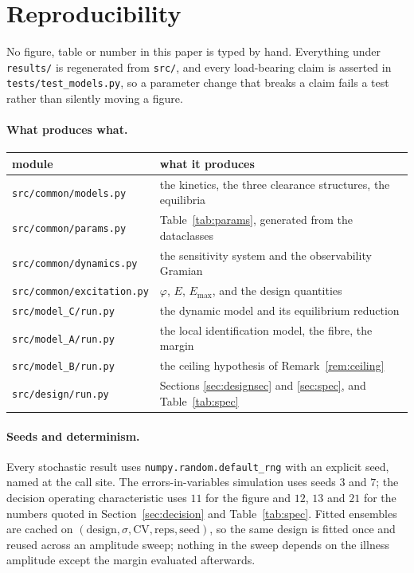 \section{Reproducibility}
\label{sec:repro}

No figure, table or number in this paper is typed by hand. Everything under
\texttt{results/} is regenerated from \texttt{src/}, and every load-bearing claim is asserted
in \texttt{tests/test\_models.py}, so a parameter change that breaks a claim fails a test
rather than silently moving a figure.

\paragraph{What produces what.}
\begin{center}
\footnotesize
\begin{tabular}{@{}ll@{}}
\toprule
\textbf{module} & \textbf{what it produces} \\
\midrule
\texttt{src/common/models.py}     & the kinetics, the three clearance structures, the equilibria \\
\texttt{src/common/params.py}     & Table~\ref{tab:params}, generated from the dataclasses \\
\texttt{src/common/dynamics.py}   & the sensitivity system and the observability Gramian \\
\texttt{src/common/excitation.py} & $\varphi$, $E$, $E_{\max}$, and the design quantities \\
\texttt{src/model\_C/run.py}      & the dynamic model and its equilibrium reduction \\
\texttt{src/model\_A/run.py}      & the local identification model, the fibre, the margin \\
\texttt{src/model\_B/run.py}      & the ceiling hypothesis of Remark~\ref{rem:ceiling} \\
\texttt{src/design/run.py}        & Sections \ref{sec:designsec} and \ref{sec:spec}, and Table~\ref{tab:spec} \\
\bottomrule
\end{tabular}
\end{center}

\paragraph{Seeds and determinism.} Every stochastic result uses
\texttt{numpy.random.default\_rng} with an explicit seed, named at the call site. The
errors-in-variables simulation uses seeds $3$ and $7$; the decision operating characteristic
uses $11$ for the figure and $12$, $13$ and $21$ for the numbers quoted in
Section~\ref{sec:decision} and Table~\ref{tab:spec}. Fitted ensembles are cached on
$(\text{design}, \sigma, \mathrm{CV}, \text{reps}, \text{seed})$, so the same design is
fitted once and reused across an amplitude sweep; nothing in the sweep depends on the
illness amplitude except the margin evaluated afterwards.

